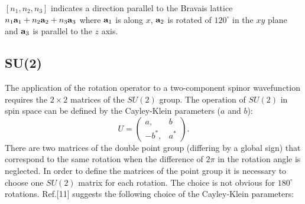 \documentclass[12pt,a4paper]{article}
\begin{document}
$[n_1,n_2,n_3]$ indicates a direction parallel
to the Bravais lattice $n_1 {\bf a}_1 + n_2 {\bf a}_2 + n_3 {\bf a}_3$
where ${\bf a}_1$ is along $x$, ${\bf a}_2$ is rotated 
of $120^\circ$ in the $xy$ plane and ${\bf a}_3$ is parallel to the $z$
axis.

\subsection{\color{web-blue}SU(2)}
The application of the rotation operator to a two-component spinor 
wavefunction requires the $2\times2$ matrices of the $SU(2)$ group.
The operation of $SU(2)$ in spin space can be defined by the Cayley-Klein
parameters ($a$ and $b$):
\begin{equation}
U=\left( \begin{array}{cc}
a, & b
\\
-b^*, & a^*
\end{array}
\right).
\nonumber
\end{equation}
There are two matrices of the double point group (differing by a global
sign) that correspond to the same rotation when the difference of $2\pi$ in
the rotation angle is neglected. In order to define the
matrices of the point group it is necessary to choose one $SU(2)$ matrix
for each rotation. The choice is not obvious for $180^\circ$ rotations.
Ref.[11] suggests the following choice of the Cayley-Klein parameters: 
\end{document}
